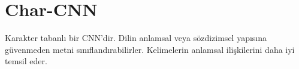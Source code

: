 \section{Char-CNN}
Karakter tabanlı bir CNN'dir. Dilin anlamsal veya sözdizimsel yapısına güvenmeden metni sınıflandırabilirler. Kelimelerin anlamsal ilişkilerini daha iyi temsil eder.

\newpage